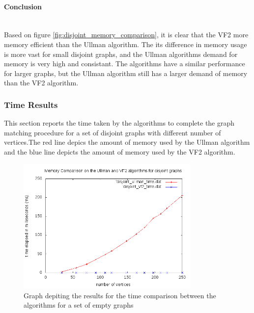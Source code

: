 \paragraph{Conclusion}\mbox{}\\
Based on figure \ref{fig:disjoint_memory_comparison}, it is clear that the VF2 more memory efficient than the Ullman algorithm. The its difference in memory 
usage is more vast for small disjoint graphs, and the Ullman algorithms demand for memory is very high and consistant. The algorithms have a similar 
performance for larger graphs, but the Ullman algorithm still has a larger demand of memory than the VF2 algorithm.


\subsubsection{Time Results}
This section reports the time taken by the algorithms to complete the graph matching procedure for a set of disjoint graphs with different number of vertices.The red line depics the amount of memory
 used by the Ullman algorithm and the blue line depicts the amount of memory used by the VF2 algorithm.

\begin{figure}[H]
  \begin{center}
      \includegraphics[width=0.8\textwidth]{disjoint_time.png}
  \end{center}    
  \caption{Graph depiting the results for the time comparison between the algorithms for a set of empty graphs}
  \label{fig:disjoint_time_comparison}
\end{figure}


